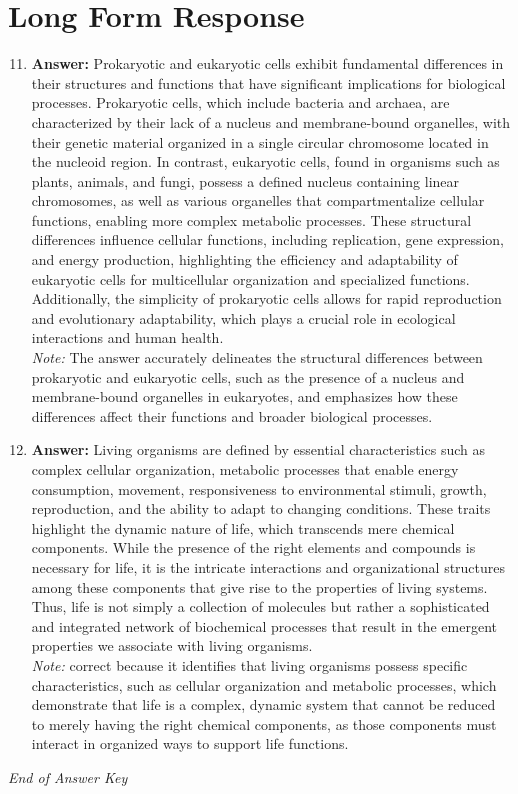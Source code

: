 \documentclass[12pt]{article}
\begin{document}
\section*{Long Form Response}
\begin{enumerate}[label=\arabic*.]
\setcounter{enumi}{10}
\item \textbf{Answer:} Prokaryotic and eukaryotic cells exhibit fundamental differences in their structures and functions that have significant implications for biological processes. Prokaryotic cells, which include bacteria and archaea, are characterized by their lack of a nucleus and membrane-bound organelles, with their genetic material organized in a single circular chromosome located in the nucleoid region. In contrast, eukaryotic cells, found in organisms such as plants, animals, and fungi, possess a defined nucleus containing linear chromosomes, as well as various organelles that compartmentalize cellular functions, enabling more complex metabolic processes. These structural differences influence cellular functions, including replication, gene expression, and energy production, highlighting the efficiency and adaptability of eukaryotic cells for multicellular organization and specialized functions. Additionally, the simplicity of prokaryotic cells allows for rapid reproduction and evolutionary adaptability, which plays a crucial role in ecological interactions and human health.
\\ \textit{Note:} The answer accurately delineates the structural differences between prokaryotic and eukaryotic cells, such as the presence of a nucleus and membrane-bound organelles in eukaryotes, and emphasizes how these differences affect their functions and broader biological processes.
\item \textbf{Answer:} Living organisms are defined by essential characteristics such as complex cellular organization, metabolic processes that enable energy consumption, movement, responsiveness to environmental stimuli, growth, reproduction, and the ability to adapt to changing conditions. These traits highlight the dynamic nature of life, which transcends mere chemical components. While the presence of the right elements and compounds is necessary for life, it is the intricate interactions and organizational structures among these components that give rise to the properties of living systems. Thus, life is not simply a collection of molecules but rather a sophisticated and integrated network of biochemical processes that result in the emergent properties we associate with living organisms.
\\ \textit{Note:} correct because it identifies that living organisms possess specific characteristics, such as cellular organization and metabolic processes, which demonstrate that life is a complex, dynamic system that cannot be reduced to merely having the right chemical components, as those components must interact in organized ways to support life functions.
\end{enumerate}

\vfill
\noindent\textit{End of Answer Key}
\end{document}
